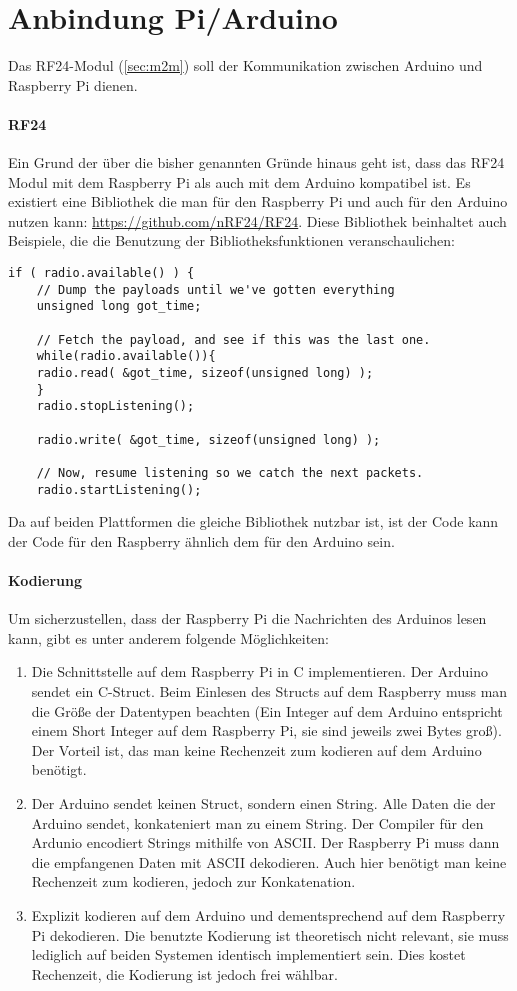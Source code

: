 \section{Anbindung Pi/Arduino}
\label{sec:anbindung_raspi_arduino}
Das RF24-Modul (\ref{sec:m2m}) soll der Kommunikation zwischen Arduino und Raspberry Pi dienen. 
\paragraph{RF24}
Ein Grund der über die bisher genannten Gründe hinaus geht ist, dass das RF24 Modul mit dem Raspberry Pi als auch mit dem Arduino kompatibel ist. Es existiert eine Bibliothek die man für den Raspberry Pi und auch für den Arduino nutzen kann: \url{https://github.com/nRF24/RF24}. Diese Bibliothek beinhaltet auch Beispiele, die die Benutzung der Bibliotheksfunktionen veranschaulichen: 
\lstset{language=c}
\begin{lstlisting}
if ( radio.available() ) {
	// Dump the payloads until we've gotten everything
	unsigned long got_time;
	
	// Fetch the payload, and see if this was the last one.
	while(radio.available()){
	radio.read( &got_time, sizeof(unsigned long) );
	}
	radio.stopListening();
				
	radio.write( &got_time, sizeof(unsigned long) );

	// Now, resume listening so we catch the next packets.
	radio.startListening();
\end{lstlisting}

Da auf beiden Plattformen die gleiche Bibliothek nutzbar ist, ist der Code kann der Code für den Raspberry ähnlich dem für den Arduino sein.
\paragraph{Kodierung}
Um sicherzustellen, dass der Raspberry Pi die Nachrichten des Arduinos lesen kann, gibt es unter anderem folgende Möglichkeiten:
\begin{enumerate}
\item Die Schnittstelle auf dem Raspberry Pi in C implementieren. Der Arduino sendet ein C-Struct. Beim Einlesen des Structs auf dem Raspberry muss man die Größe der Datentypen beachten (Ein Integer auf dem Arduino entspricht einem Short Integer auf dem Raspberry Pi, sie sind jeweils zwei Bytes groß). Der Vorteil ist, das man keine Rechenzeit zum kodieren auf dem Arduino benötigt.
\item Der Arduino sendet keinen Struct, sondern einen String. Alle Daten die der Arduino sendet, konkateniert man zu einem String. Der Compiler für den Ardunio encodiert Strings mithilfe von ASCII. Der Raspberry Pi muss dann die empfangenen Daten mit ASCII dekodieren. Auch hier benötigt man keine Rechenzeit zum kodieren, jedoch zur Konkatenation.
\item Explizit kodieren auf dem Arduino und dementsprechend auf dem Raspberry Pi dekodieren. Die benutzte Kodierung ist theoretisch nicht relevant, sie muss lediglich auf beiden Systemen identisch implementiert sein. Dies kostet Rechenzeit, die Kodierung ist jedoch frei wählbar.
\end{enumerate}


